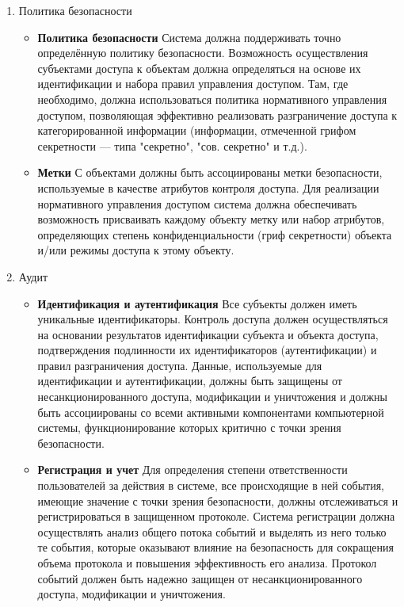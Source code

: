 \begin{enumerate}
	\item Политика безопасности
	\begin{itemize}
		\item \textbf{Политика безопасности}
		Система должна поддерживать точно определённую политику безопасности. Возможность осуществления субъектами доступа к объектам должна определяться на основе их идентификации и набора правил управления доступом. Там, где необходимо, должна использоваться политика нормативного управления доступом, позволяющая эффективно реализовать разграничение доступа к категорированной информации (информации, отмеченной грифом секретности — типа "секретно", "сов. секретно" и т.д.).
		\item \textbf{Метки} С объектами должны быть ассоциированы метки безопасности, используемые в качестве атрибутов контроля доступа. Для реализации нормативного управления доступом система должна обеспечивать возможность присваивать каждому объекту метку или набор атрибутов, определяющих  степень конфиденциальности (гриф секретности) объекта и/или режимы доступа к этому объекту.
	\end{itemize}
	\item Аудит
	\begin{itemize}
		\item \textbf{Идентификация и аутентификация} Все субъекты должен иметь уникальные идентификаторы. Контроль доступа должен осуществляться на основании результатов идентификации субъекта и объекта доступа, подтверждения подлинности их идентификаторов (аутентификации) и правил разграничения доступа. Данные, используемые для идентификации и аутентификации, должны быть защищены от несанкционированного доступа, модификации и уничтожения и должны быть ассоциированы со всеми активными компонентами компьютерной системы, функционирование которых критично с точки зрения безопасности.
		\item \textbf{Регистрация и учет} Для определения степени ответственности пользователей за действия в системе, все происходящие в ней события, имеющие значение с точки зрения безопасности, должны отслеживаться и регистрироваться в защищенном протоколе. Система регистрации должна осуществлять анализ общего потока событий и выделять из него только те события, которые оказывают влияние на безопасность для сокращения объема протокола и повышения эффективность его анализа. Протокол событий должен быть надежно защищен от несанкционированного доступа, модификации и уничтожения.
	\end{itemize}

\end{enumerate}
